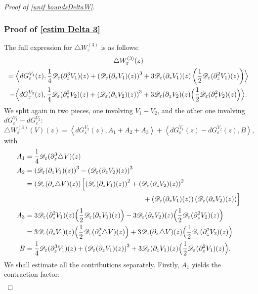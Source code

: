 \documentclass[10pt]{amsart}
\let\mathcal\mathscr
\theoremstyle{plain}
\theoremstyle{definition}
\newcommand{\D}{\mathcal{D}_\eps}
\let\eps\varepsilon
\newcommand{\dQVA}{dG_\eps^{V_1}}
\newcommand{\dQVB}{dG_\eps^{V_2}}
\begin{document}
\begin{proof}[Proof of \cref{unif boundsDeltaW}]
\subsubsection*{Proof of \eqref{estim Delta 3}}
The full expression for $\triangle W_\eps^{(3)}$ is as follows:
\begin{multline*}
\triangle W_\eps^{(3)}(z)\\ =
\Bigl\langle \dQVA(z), \dfrac{1}{4} \D(\partial_z^3 V_1)(z) + \left(\D(\partial_z V_1)(z)\right)^3 + 3\D(\partial_z V_1)(z) \left(\dfrac{1}{2} \D(\partial_z^2 V_1)(z)\right) \Bigr\rangle\\
-\Bigl\langle \dQVB(z), \dfrac{1}{4} \D(\partial_z^3 V_2)(z) + \left(\D(\partial_z V_2)(z)\right)^3 + 3 \D(\partial_z V_2)(z) \Bigl(\dfrac{1}{2} \D(\partial_z^2 V_2)(z) \Bigr) \Bigr\rangle.	
\end{multline*}
We split again in two pieces, one involving $V_1-V_2$, and the other one involving \hbox{$\dQVA-\dQVB$}:
\begin{equation*}
\triangle W_\eps^{(3)}(V)(z) = \left\langle \dQVB(z), A_1 + A_2 + A_3 \right\rangle + \left\langle \dQVA(z)-\dQVB(z),B \right\rangle,
\end{equation*}
with
\begin{align*}
A_1 &= \dfrac{1}{4} \D(\partial_z^3 \triangle V)(z) \\
A_2 & = \left(\D(\partial_z V_1)(z)\right)^3 - \left(\D(\partial_z V_2)(z)\right)^3 \\
& =
\left(\D(\partial_z \triangle V)(z)\right)
\Bigl[ \left(\D(\partial_z V_1)(z)\right)^2
+ \left(\D(\partial_z V_2)(z)\right)^2\\
&\hspace*{6cm} + \left(\D(\partial_z V_1)(z)\right)\left(\D(\partial_z V_2)(z)\right) \Bigr]\\
A_3 & = 
3 \D(\partial_z^2 V_1)(z) \Bigl( \dfrac{1}{2} \D(\partial_z V_1)(z) \Bigr) -  3 \D(\partial_z V_2)(z) \Bigl( \dfrac{1}{2} \D(\partial_z^2 V_2)(z) \Bigr)\\
& = 3 \D(\partial_z V_1)(z) \Bigl(\dfrac{1}{2} \D(\partial_z^2 \triangle V)(z) \Bigr) + 3 \D(\partial_z \triangle V)(z) \Bigl(\dfrac{1}{2} \D(\partial_z^2 V_2)(z) \Bigr)\\
B &= \dfrac{1}{4} \D(\partial_z^3 V_1)(z) + \left(\D(\partial_z V_1)(z)\right)^3
+ 3\D(\partial_z V_1)(z) \Bigl(\dfrac{1}{2} \D(\partial_z^2 V_1)(z) \Bigr).
\end{align*}
We shall estimate all the contributions separately. Firstly, $A_1$ yields the contraction factor:
\begin{align*}

\end{align*}
\end{proof}
\end{document}
